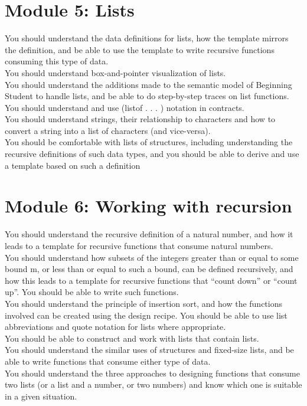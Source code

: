 \documentclass[12pt,letter]{article}
\begin{document}
\section*{Module 5: Lists}
You should understand the data definitions for lists, how the
template mirrors the definition, and be able to use the template to
write recursive functions consuming this type of data.\\ 
You should understand box-and-pointer visualization of lists.\\ 
You should understand the additions made to the semantic model of
Beginning Student to handle lists, and be able to do step-by-step
traces on list functions.\\ 
You should understand and use (listof . . . ) notation in contracts.\\ 
You should understand strings, their relationship to characters and
how to convert a string into a list of characters (and vice-versa). \\ 
You should be comfortable with lists of structures, including
understanding the recursive definitions of such data types, and you
should be able to derive and use a template based on such a
definition

\section*{Module 6: Working with recursion}
You should understand the recursive definition of a natural number,
and how it leads to a template for recursive functions that consume
natural numbers.\\ 
You should understand how subsets of the integers greater than or
equal to some bound m, or less than or equal to such a bound, can
be defined recursively, and how this leads to a template for recursive
functions that “count down” or “count up”. You should be able to
write such functions.\\ 
You should understand the principle of insertion sort, and how the
functions involved can be created using the design recipe.
You should be able to use list abbreviations and quote notation for
lists where appropriate. \\ 
You should be able to construct and work with lists that contain lists.\\ 
You should understand the similar uses of structures and fixed-size
lists, and be able to write functions that consume either type of data.\\ 
You should understand the three approaches to designing functions
that consume two lists (or a list and a number, or two numbers) and
know which one is suitable in a given situation.
\end{document}
